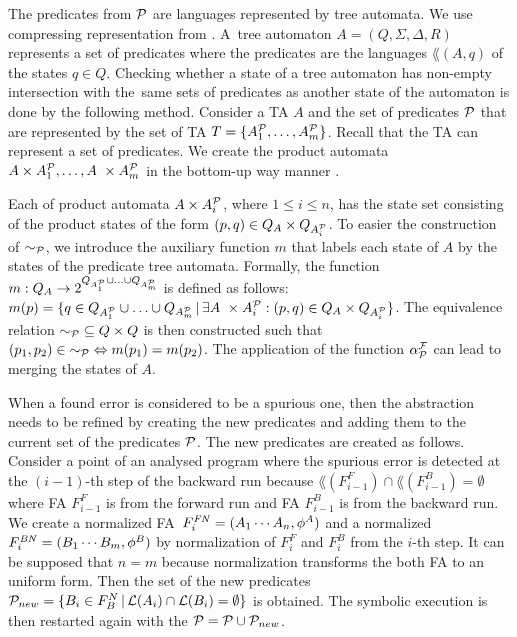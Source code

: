 The predicates from $\mathcal{P}$ are languages represented by tree automata.
We use compressing representation from \cite{artmc}.
A~tree automaton $A=(Q,\Sigma,\Delta, R)$ represents a set of predicates
where the predicates are the languages $\lang(A,q)$ of the states $q \in Q$.
Checking whether a state of a tree automaton has non-empty intersection
with the~same sets of predicates as another state of the automaton is done by the following method.
Consider a TA $A$ and the set of predicates $\mathcal{P}$
that are represented by the set of TA $T=\{A^\mathcal{P}_{1}, \ldots, A^\mathcal{P}_{m}\}$.
Recall that the TA can represent a set of predicates.
We create the product automata $A \times A^\mathcal{P}_{1}, \ldots, A~\times A^\mathcal{P}_{m}$
in the bottom-up way manner \cite{tata2007}.

Each of product automata $A \times A^\mathcal{P}_{i}$, where $1 \leq i \leq n$, has the state set
consisting of the product states of the form $(p,q) \in Q_A \times Q_{A^\mathcal{P}_{i}}$.
To easier the construction of $\sim_{\mathcal{P}}$, we introduce the auxiliary function $m$ that labels
each state of $A$ by the states of the predicate tree automata.
Formally, the function $m: Q_A \rightarrow 2^{Q_{A^\mathcal{P}_{1}} \cup \ldots
\cup Q_{A^\mathcal{P}_{m}}}$ is defined as follows: $m(p) = \{q \in Q_{A^\mathcal{P}_{1}} \cup \ldots \cup Q_{A^\mathcal{P}_{m}}\,|\,
\exists A~\times A^\mathcal{P}_{i}: (p,q) \in Q_{A} \times Q_{A^\mathcal{P}_{i}}\}$.
The equivalence relation ${\sim_{\mathcal{P}}} \subseteq {Q \times Q}$ is then constructed
such that ${(p_1,p_2)} \in {\sim_{\mathcal{P}}} \Leftrightarrow m(p_1) = m(p_2)$.
The application of the function $\alpha_{\mathcal{P}}^{\mathcal{F}}$ can lead to merging the states of $A$.

When a found error is considered to be a spurious one, then the abstraction needs to be refined
by creating the new predicates and adding them to the current set of the predicates $\mathcal{P}$.
The new predicates are created as follows.
Consider a point of an analysed program where the spurious error
is detected at the $(i-1)$-th step of the backward run
because $\lang(F^F_{i-1}) \cap \lang(F^B_{i-1}) = \emptyset$ where FA $F^F_{i-1}$ is from the forward run
and FA $F^B_{i-1}$ is from the backward run.
We create a normalized FA~$F_{i}^{\mathit{FN}} = (A_1 \cdots A_n, \phi^{A})$ and a normalized $F_{i}^{\mathit{BN}} = (B_1 \cdots B_m, \phi^{B})$
by normalization of $F^{\mathit{F}}_{i}$ and $F^\mathit{B}_{i}$ from the $i$-th step.
It can be supposed that $n = m$ because normalization transforms
the both FA to an uniform form.
Then the set of the new predicates $\mathcal{P}_{new} = \{B_i \in F^N_B \,|\, \mathcal{L}(A_i) \cap \mathcal{L}(B_i) =
\emptyset\}$ is obtained.
The symbolic execution is then restarted again with the $\mathcal{P} = \mathcal{P} \cup \mathcal{P}_{new}$.

